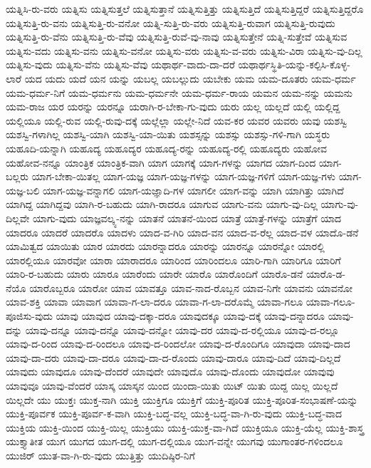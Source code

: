 {ಯತ್ನಿಸಿ-ರು-ವರು
ಯತ್ನಿಸು
ಯತ್ನಿಸುತ್ತಲೆ
ಯತ್ನಿಸುತ್ತಾನೆ
ಯತ್ನಿಸುತ್ತಿತ್ತು
ಯತ್ನಿಸುತ್ತಿದೆ
ಯತ್ನಿಸುತ್ತಿದ್ದರೆ
ಯತ್ನಿಸುತ್ತಿದ್ದರೊ
ಯತ್ನಿಸುತ್ತಿ-ರು-ವನು
ಯತ್ನಿಸುತ್ತಿ-ರು-ವನೋ
ಯತ್ನಿ-ಸುತ್ತಿ-ರು-ವರು
ಯತ್ನಿಸುತ್ತಿ-ರುವಾಗ
ಯತ್ನಿಸುತ್ತಿ-ರುವುದು
ಯತ್ನಿಸುತ್ತಿ-ರು-ವೆನು
ಯತ್ನಿಸುತ್ತಿ-ರು-ವೆವು
ಯತ್ನಿಸುತ್ತಿ-ರುವೆ-ವು-ನಾವು
ಯತ್ನಿಸುತ್ತೇನೆ
ಯತ್ನಿ-ಸುತ್ತೇವೆ
ಯತ್ನಿಸುವ
ಯತ್ನಿಸು-ವದು
ಯತ್ನಿಸು-ವನು
ಯತ್ನಿಸು-ವನೋ
ಯತ್ನಿಸು-ವರು
ಯತ್ನಿಸು-ವ-ವರು
ಯತ್ನಿಸು-ವಿರಾ
ಯತ್ನಿಸು-ವು-ದಿಲ್ಲ
ಯತ್ನಿಸು-ವುದು
ಯತ್ನಿಸು-ವೆನು
ಯತ್ನಿಸು-ವೆವು
ಯಥಾರ್ಥ-ವಾದು-ದಾ-ದರೆ
ಯಥಾರ್ಥಸ್ಥಿತಿ-ಯನ್ನು-ಕಲ್ಪಿಸಿ-ಕೊಳ್ಳ-ಲಾರೆ
ಯದ
ಯದು
ಯದೆ
ಯನ
ಯನ್ನು
ಯಬಲ್ಲ
ಯಬಲ್ಲುದು
ಯಬೇಕು
ಯಮ
ಯಮ-ದೂತರು
ಯಮ-ಧರ್ಮ
ಯಮ-ಧರ್ಮ-ನಿಗೆ
ಯಮ-ಧರ್ಮನು
ಯಮ-ಧರ್ಮನೇ
ಯಮ-ಧರ್ಮ-ರಾಯ
ಯಮನ
ಯಮ-ನನ್ನು
ಯಮನು
ಯಮ-ರಾಜ
ಯರ
ಯರನ್ನು
ಯರನ್ನೂ
ಯರಾಗಿ-ರ-ಬೇಕಾ-ಗು-ವುದು
ಯರು
ಯಲ್ಲ
ಯಲ್ಲದೆ
ಯಲ್ಲಿ
ಯಲ್ಲಿದ್ದ
ಯಲ್ಲಿಯೂ
ಯಲ್ಲಿ-ರುವ
ಯಲ್ಲಿ-ರುವು-ದಕ್ಕೆ
ಯಲ್ಲೆಲ್ಲಾ
ಯಲ್ಲೇ-ನಿದೆ
ಯವ-ಕರ
ಯವರ
ಯವರು
ಯವು
ಯಶಸ್ವಿ
ಯಶಸ್ವಿ-ಗಳಾಗಿಲ್ಲ
ಯಶಸ್ವಿ-ಯಾಗಿ
ಯಶಸ್ವಿ-ಯಾ-ಯಿತು
ಯಶಸ್ಸನ್ನು
ಯಶಸ್ಸು
ಯಶಸ್ಸು-ಗಳಿ-ಗಾಗಿ
ಯಸ್ಥರು
ಯಹೂದಿ-ಯನ್ನಾಗಿ
ಯಹೂದ್ಯ
ಯಹೂದ್ಯರ
ಯಹೂದ್ಯ-ರನ್ನು
ಯಹೂದ್ಯ-ರಲ್ಲಿ
ಯಹೂದ್ಯರು
ಯಹೋವ
ಯಹೋವ-ನನ್ನೂ
ಯಾಂತ್ರಿಕ
ಯಾಂತ್ರಿಕ-ವಾಗಿ
ಯಾಗ
ಯಾಗಕ್ಕೆ
ಯಾಗ-ಗಳನ್ನು
ಯಾಗದ
ಯಾಗ-ದಿಂದ
ಯಾಗ-ಬಲ್ಲರು
ಯಾಗ-ಬೇಕಾ-ಯಿತಲ್ಲ
ಯಾಗ-ಯಜ್ಞ
ಯಾಗ-ಯಜ್ಞ-ಗಳನ್ನು
ಯಾಗ-ಯಜ್ಞ-ಗಳಿಗೆ
ಯಾಗ-ಯಜ್ಞ-ಗಳು
ಯಾಗ-ಯಜ್ಞ-ಬಲಿ
ಯಾಗ-ಯಜ್ಞ-ವನ್ನಾಗಲಿ
ಯಾಗ-ಯಜ್ಞಾದಿ-ಗಳ
ಯಾಗಲೀ
ಯಾಗ-ವನ್ನು
ಯಾಗಿ
ಯಾಗಿತ್ತು
ಯಾಗಿದೆ
ಯಾಗಿದ್ದ
ಯಾಗಿದ್ದವು
ಯಾಗಿ-ರ-ಬಹುದು
ಯಾಗಿ-ರಾದರೂ
ಯಾಗುವ
ಯಾಗು-ವನು
ಯಾಗು-ವು-ದಿಲ್ಲ
ಯಾಗು-ವು-ದಿಲ್ಲವೇ
ಯಾಗು-ವುದು
ಯಾಜ್ಞವಲ್ಕ್ಯ-ನನ್ನು
ಯಾತನೆ
ಯಾತನೆ-ಯಿಂದ
ಯಾತ್ರೆ
ಯಾತ್ರೆ-ಗಳನ್ನು
ಯಾತ್ರೆಗೆ
ಯಾದ
ಯಾದರೂ
ಯಾದರೆ
ಯಾದರೊ
ಯಾದಳು
ಯಾದ-ವ-ಗಿರಿ
ಯಾದ-ವನ
ಯಾದ-ವ-ರೆಲ್ಲ
ಯಾದ-ವಳ
ಯಾದೊ-ಡನೆ
ಯಾಮಿತ್ವದ
ಯಾಯಿತು
ಯಾರ
ಯಾರದು
ಯಾರನ್ನಾದರೂ
ಯಾರನ್ನು
ಯಾರನ್ನೂ
ಯಾರನ್ನೋ
ಯಾರಲ್ಲಿ
ಯಾರಲ್ಲಿಯೂ
ಯಾರವೋ
ಯಾರಾ
ಯಾರಾದರೂ
ಯಾರಿಂದ
ಯಾರಿಂದಲೂ
ಯಾರಿ-ಗಾಗಿ
ಯಾರಿಗೂ
ಯಾರಿಗೆ
ಯಾರಿ-ರ-ಬಹುದು
ಯಾರು
ಯಾರೂ
ಯಾರೆಂದು
ಯಾರೇ
ಯಾರೊ
ಯಾರೊಂದಿಗೆ
ಯಾರೊ-ಡನೆ
ಯಾರೊ-ಡ-ನೆಯೊ
ಯಾರೊಬ್ಬರೂ
ಯಾರೋ
ಯಾವ
ಯಾವತ್ತೂ
ಯಾವ-ನಾದ-ರೊಬ್ಬನ
ಯಾವ-ನಿಗೇ
ಯಾವನು
ಯಾವನೋ
ಯಾವ-ಶಕ್ತಿ
ಯಾವಾ
ಯಾವಾಗ
ಯಾವಾ-ಗ-ಲಾ-ದರೂ
ಯಾವಾ-ಗ-ಲಾ-ದರೊಮ್ಮೆ
ಯಾವಾ-ಗಲೂ
ಯಾವಾ-ಗಲೂ-ಪೂಜಿಸು-ವುದು
ಯಾವು
ಯಾವುದ
ಯಾವು-ದಕ್ಕಾ-ದರೂ
ಯಾವುದಕ್ಕೂ
ಯಾವು-ದಕ್ಕೆ
ಯಾವು-ದನ್ನಾದರೂ
ಯಾವು-ದನ್ನು
ಯಾವು-ದನ್ನೂ
ಯಾವು-ದನ್ನೊ
ಯಾವು-ದನ್ನೋ
ಯಾವು-ದರ
ಯಾವು-ದ-ರಲ್ಲಿಯೂ
ಯಾವು-ದ-ರಲ್ಲೂ
ಯಾವು-ದ-ರಿಂದ
ಯಾವು-ದ-ರಿಂದಲೂ
ಯಾವು-ದ-ರಿಂದಲೋ
ಯಾವು-ದ-ರೊಂದಿಗೂ
ಯಾವುದಾ
ಯಾವು-ದಾದ
ಯಾವು-ದಾ-ದರು
ಯಾವು-ದಾ-ದರೂ
ಯಾವು-ದಾ-ದ-ರೊಂದು
ಯಾವು-ದಾರೂ
ಯಾವು-ದಿದೆ
ಯಾವು-ದಿಲ್ಲದೆ
ಯಾವುದು
ಯಾವುದೂ
ಯಾವು-ದೆಂದರೆ
ಯಾವುದೇ
ಯಾವುದೊ
ಯಾವು-ದೊಂದು
ಯಾವುದೋ
ಯಾವುವು
ಯಾವುವೂ
ಯಾವು-ವೆಂದರೆ
ಯಾಸ್ಕ
ಯಾಸ್ಕನ
ಯಿಂದ
ಯಿಂದಾ-ಯಿತು
ಯಿಟ್
ಯಿತು
ಯಿದ್ದ
ಯಿಲ್ಲ
ಯಿಲ್ಲದೆ
ಯಿಲ್ಲದೇ
ಯು
ಯುಕ್ತಃ
ಯುಕ್ತ-ನಾಗಿ
ಯುಕ್ತಿ
ಯುಕ್ತಿಗೂ
ಯುಕ್ತಿಗೆ
ಯುಕ್ತಿ-ಪೂರಿತ
ಯುಕ್ತಿ-ಪೂರಿತ-ಸಂಭಾಷಣೆ-ಯನ್ನು
ಯುಕ್ತಿ-ಪೂರ್ವಕ
ಯುಕ್ತಿ-ಪೂರ್ವ-ಕ-ವಾಗಿ
ಯುಕ್ತಿ-ಬದ್ಧ-ವಲ್ಲ
ಯುಕ್ತಿ-ಬದ್ಧ-ವಾ-ಗಿ-ರು-ವುದು
ಯುಕ್ತಿ-ಬದ್ಧ-ವಾದ
ಯುಕ್ತಿಯ
ಯುಕ್ತಿ-ಯಿಂದ
ಯುಕ್ತಿ-ಯಿಲ್ಲ
ಯುಕ್ತಿಯು
ಯುಕ್ತಿ-ಯುಕ್ತ-ವಾ-ಗಿದೆ
ಯುಕ್ತಿಯೂ
ಯುಕ್ತಿ-ಯೆಲ್ಲ
ಯುಕ್ತಿ-ಶಾಸ್ತ್ರ
ಯುಕ್ತ್ಯಾತೀತ
ಯುಗ
ಯುಗದ
ಯುಗ-ದಲ್ಲಿ
ಯುಗ-ದಲ್ಲಿಯೂ
ಯುಗ-ವನ್ನೇ
ಯುಗವು
ಯುಗಾಂತರ-ಗಳಿಂದಲೂ
ಯುಜಿರ್
ಯುತ-ವಾ-ಗಿ-ರು-ವುದು
ಯುತ್ತಿತ್ತು
ಯುದಿಷ್ಠಿರ-ನಿಗೆ
}
